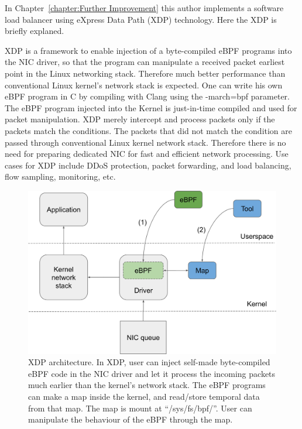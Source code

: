 In Chapter~\ref{chapter:Further Improvement} this author implements a software load balancer using eXpress Data Path (XDP)\cite{hoiland2018express} technology.
Here the XDP is briefly explaned.

XDP is a framework to enable injection of a byte-compiled eBPF programs into the NIC driver, so that the program can manipulate a received packet earliest point in the Linux networking stack.
Therefore much better performance than conventional Linux kernel's network stack is expected.
One can write his own eBPF program in C by compiling with Clang using the -march=bpf parameter.
The eBPF program injected into the Kernel is just-in-time compiled and used for packet manipulation.
XDP merely intercept and process packets only if the packets match the conditions.
The packets that did not match the condition are passed through conventional Linux kernel network stack.
Therefore there is no need for preparing dedicated NIC for fast and efficient network processing.
Use cases for XDP include DDoS protection, packet forwarding, and load balancing, flow sampling, monitoring, etc.

\begin{figure}[h]
  \centering
  \includegraphics[width=0.9\columnwidth]{Figs/xdp-schem}

  \par\bigskip
  \centering
  \begin{minipage}{0.9\columnwidth}
    \caption[XDP architecture]{
      XDP architecture.
      In XDP, user can inject self-made byte-compiled eBPF code in the NIC driver and let it process the incoming packets much earlier than the kernel's network stack.
      The eBPF programs can make a map inside the kernel, and read/store temporal data from that map.
      The map is mount at \enquote{/sys/fs/bpf/}.
      User can manipulate the behaviour of the eBPF through the map.
    }
    \label{fig:xdp-schem}
  \end{minipage}
\end{figure}

